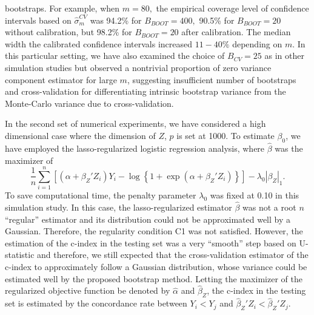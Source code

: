 \documentclass[12pt]{article}
\begin{document}
bootstraps. For example, when $m=80,$ the empirical coverage level of confidence intervals based on $\widehat{\sigma}_m^{CV}$ was 94.2\% for $B_{BOOT}=400,$  90.5\% for $B_{BOOT}=20$ without calibration, but 98.2\% for $B_{BOOT}=20$ after calibration. The median width the calibrated confidence intervals increased $11 - 40\%$ depending on $m$. In this particular setting, we have also examined the choice of $B_{CV}=25$ as in other simulation studies but observed a nontrivial proportion of zero variance component estimator for large $m$, suggesting insufficient number of bootstraps and cross-validation for differentiating intrinsic bootstrap variance from the Monte-Carlo variance due to cross-validation.


In the second set of numerical experiments, we have considered a high dimensional case where the dimension of $Z$, $p$ is set at 1000. To estimate $\beta_0$, we have employed the lasso-regularized logistic regression analysis, where $\hat{\beta}$ was the maximizer of 
$$ \frac{1}{n}\sum_{i=1}^n \left[ (\alpha+\beta_Z'Z_i) Y_i-\log\left\{1+\exp(\alpha+\beta_Z'Z_i)  \right\}\right]-\lambda_0|\beta_Z|_1.$$
 To save computational time, the penalty parameter $\lambda_0$ was fixed at 0.10 in this simulation study. In this case, the lasso-regularized estimator $\hat{\beta}$ was not a root $n$ ``regular'' estimator and its distribution could not be approximated well by a Gaussian. Therefore, the regularity condition C1 was not satisfied. However, the estimation of the c-index in the testing set was a very ``smooth'' step based on U-statistic and therefore, we still expected that the cross-validation estimator of the c-index to approximately follow a Gaussian distribution, whose variance could be estimated well by the proposed bootstrap method. Letting the maximizer of the regularized objective function be denoted by $\hat{\alpha}$ and $\hat{\beta}_Z$, the c-index in the testing set is estimated by the concordance rate between $Y_i<Y_j$ and $\hat{\beta}_Z'Z_i<\hat{\beta}_Z'Z_j.$
\end{document}
